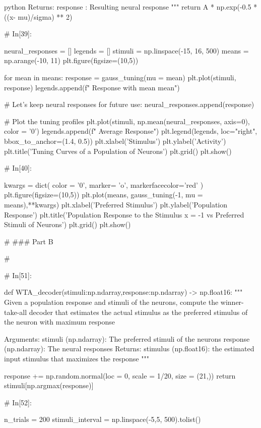 \documentclass[12pt]{amsart}
\begin{document}
\begin{mintedbox}{python}
        Returns:
            response : Resulting neural response
        """             
    return A * np.exp(-0.5 * ((x- mu)/sigma) ** 2)


# In[39]:


neural_responses = []
legends = []
stimuli = np.linspace(-15, 16, 500)
means = np.arange(-10, 11)
plt.figure(figsize=(10,5))

for mean in means:
    response = gauss_tuning(mu = mean)
    plt.plot(stimuli, response)
    legends.append(f" Response with mean {mean}")
    
    # Let's keep neural responses for future use:
    neural_responses.append(response)

# Plot the tuning profiles
plt.plot(stimuli, np.mean(neural_responses, axis=0), color = '0')
legends.append(f" Average Response")
plt.legend(legends, loc="right", bbox_to_anchor=(1.4, 0.5))
plt.xlabel('Stimulus')
plt.ylabel('Activity')
plt.title('Tuning Curves of a Population of Neurons')
plt.grid()
plt.show()


# In[40]:


kwargs = dict(
            color = '0',
            marker= 'o',
            markerfacecolor='red'
)
plt.figure(figsize=(10,5))
plt.plot(means, gauss_tuning(-1, mu = means),**kwargs)
plt.xlabel('Preferred Stimulus')
plt.ylabel('Population Response')
plt.title('Population Response to the Stimulus x = -1 vs Preferred Stimuli of Neurons')
plt.grid()
plt.show()


# ### Part B

# 

# In[51]:


def WTA_decoder(stimuli:np.ndarray,response:np.ndarray) -> np.float16:
    """
    Given a population response and  stimuli of the
    neurons, compute the winner-take-all decoder that 
    estimates the actual stimulus as the preferred
    stimulus of the neuron with maximum response

        Arguments:
            stimuli  (np.ndarray): The preferred stimuli of the neurons
            response (np.ndarray): The neural responses
        Returns:
            stimulus (np.float16): the estimated input stimulus that maximizes the response
    """

    response += np.random.normal(loc = 0, scale = 1/20, size = (21,)) 
    return stimuli[np.argmax(response)]


# In[52]:


n_trials = 200
stimuli_interval = np.linspace(-5,5, 500).tolist()


\end{mintedbox}
\end{document}
